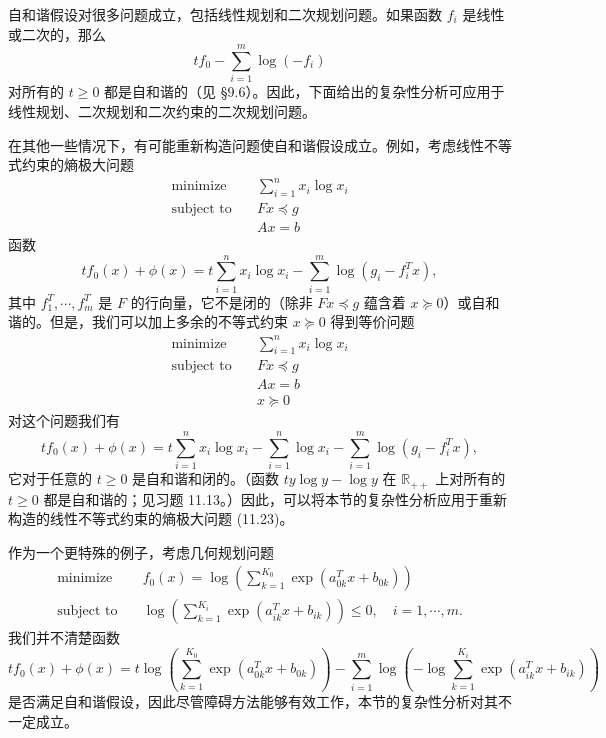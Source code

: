 \documentclass[UTF8,12pt,a4paper,fontset=fandol]{ctexart}
\begin{document}
自和谐假设对很多问题成立，包括线性规划和二次规划问题。如果函数 $f_i$ 是线性或二次的，那么
\[
tf_0-\sum_{i=1}^m\log(-f_i)
\]
对所有的 $t\geq 0$ 都是自和谐的（见 \S9.6）。因此，下面给出的复杂性分析可应用于线性规划、二次规划和二次约束的二次规划问题。

在其他一些情况下，有可能重新构造问题使自和谐假设成立。例如，考虑线性不等式约束的熵极大问题
\[
\begin{aligned}
\text{minimize}\quad & \sum_{i=1}^n x_i\log x_i\\
\text{subject to}\quad & Fx\preceq g\\
& Ax=b
\end{aligned}
\]
函数
\[
tf_0(x)+\phi(x)=t\sum_{i=1}^n x_i\log x_i-\sum_{i=1}^m\log(g_i-f_i^Tx),
\]
其中 $f_1^T,\cdots,f_m^T$ 是 $F$ 的行向量，它不是闭的（除非 $Fx\preceq g$ 蕴含着 $x\succeq 0$）或自和谐的。但是，我们可以加上多余的不等式约束 $x\succeq 0$ 得到等价问题
\begin{equation}
\begin{aligned}
\text{minimize}\quad & \sum_{i=1}^n x_i\log x_i\\
\text{subject to}\quad & Fx\preceq g\\
& Ax=b\\
& x\succeq 0
\end{aligned}
\tag{11.23}
\end{equation}
对这个问题我们有
\[
tf_0(x)+\phi(x)=t\sum_{i=1}^n x_i\log x_i-\sum_{i=1}^n\log x_i-\sum_{i=1}^m\log(g_i-f_i^Tx),
\]
它对于任意的 $t\geq 0$ 是自和谐和闭的。（函数 $ty\log y-\log y$ 在 $\mathbb{R}_{++}$ 上对所有的 $t\geq 0$ 都是自和谐的；见习题 11.13。）因此，可以将本节的复杂性分析应用于重新构造的线性不等式约束的熵极大问题 (11.23)。

作为一个更特殊的例子，考虑几何规划问题
\[
\begin{aligned}
\text{minimize}\quad & f_0(x)=\log\left(\sum_{k=1}^{K_0}\exp(a_{0k}^Tx+b_{0k})\right)\\
\text{subject to}\quad & \log\left(\sum_{k=1}^{K_i}\exp(a_{ik}^Tx+b_{ik})\right)\leq 0,\quad i=1,\cdots,m.
\end{aligned}
\]
我们并不清楚函数
\[
tf_0(x)+\phi(x)=t\log\left(\sum_{k=1}^{K_0}\exp(a_{0k}^Tx+b_{0k})\right)
-\sum_{i=1}^m\log\left(-\log\sum_{k=1}^{K_i}\exp(a_{ik}^Tx+b_{ik})\right)
\]
是否满足自和谐假设，因此尽管障碍方法能够有效工作，本节的复杂性分析对其不一定成立。
\end{document}

